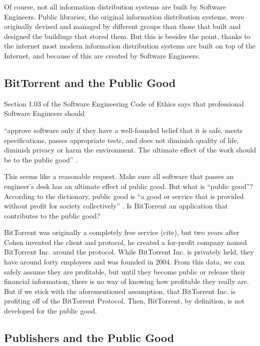 \documentclass[11pt]{article}
\begin{document}
Of course, not all information distribution systems are built by Software Engineers. Public libraries, the original information distribution systems, were originally devised and managed by different groups than those that built and designed the buildings that stored them. But this is besides the point, thanks to the internet most modern information distribution systems are built on top of the Internet, and because of this are created by Software Engineers.

\subsection{BitTorrent and the Public Good}

Section 1.03 of the Software Engineering Code of Ethics says that professional Software Engineers should

{\addtolength{\leftskip}{6mm}

   ``approve software only if they have a well-founded belief that it is safe, meets specifications, passes appropriate tests, and does not diminish quality of life, diminish privacy or harm the environment. The ultimate effect of the work should be to the public good'' \cite[1.03]{secode}.

}

This seems like a reasonable request. Make sure all software that passes an engineer's desk has an ultimate effect of public good. But what is ``public good''? According to the dictionary, public good is ``a good or service that is provided without profit for society collectively'' \cite{pubgooddef}. Is BitTorrent an application that contributes to the public good?

BitTorrent was originally a completely free service (cite), but two years after Cohen invented the client and protocol, he created a for-profit company named BitTorrent Inc. around the protocol. While BitTorrent Inc. is privately held, they have around forty employees and was founded in 2004. From this data, we can safely assume they are profitable, but until they become public or release their financial information, there is no way of knowing how profitable they really are. But if we stick with the aforementioned assumption, that BitTorrent Inc. is profiting off of the BitTorrent Protocol. Then, BitTorrent, by definition, is not developed for the public good.

\subsection{Publishers and the Public Good}
\end{document}
